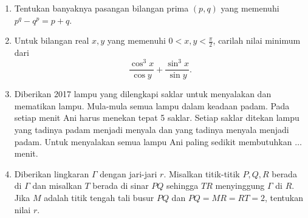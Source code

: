 \documentclass[12pt]{scrartcl}
\begin{document}
\begin{enumerate}[resume]
		\item Tentukan banyaknya pasangan bilangan prima $(p,q)$ yang memenuhi $p^q-q^p = p+q$.
		
		\item Untuk bilangan real $x,y$ yang memenuhi $0 < x,y < \frac{\pi}{2}$, carilah nilai minimum dari $$\frac{\cos^3 x}{\cos y}+\frac{\sin^3 x}{\sin y}.$$
		
		\item Diberikan 2017 lampu yang dilengkapi saklar untuk menyalakan dan mematikan
		lampu. Mula-mula semua lampu dalam keadaan padam. Pada setiap menit Ani harus
		menekan tepat 5 saklar. Setiap saklar ditekan lampu yang tadinya padam menjadi
		menyala dan yang tadinya menyala menjadi padam. Untuk menyalakan semua lampu
		Ani paling sedikit membutuhkan $\dots$ menit.
		
		\item Diberikan lingkaran $\Gamma$ dengan jari-jari $r$. Misalkan titik-titik $P,Q,R$ berada di $\Gamma$ dan misalkan $T$ berada di sinar $PQ$ sehingga $TR$ menyinggung $\Gamma$ di $R$. Jika $M$ adalah titik tengah tali busur $PQ$ dan $PQ = MR = RT = 2$, tentukan nilai $r$. 
	
\end{enumerate}
\end{document}
